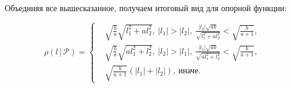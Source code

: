 \documentclass[11pt]{article}
\newcommand\PS{\mathcal{P}}
\newcommand\Sup[2]{\rho( #1 \, | \, #2 )}
\begin{document}
Объединяя все вышесказанное, получаем итоговый вид для опорной функции:

\begin{equation}
\Sup{l}{\PS} = 
\left\{
	\begin{aligned}
	& \sqrt{\frac{b}{a}}\sqrt{l_1^2+al_2^2}, \ |l_1| > |l_2|, \  \frac{|l_2|\sqrt{ab}}{\sqrt{l_1^2+al_2^2}} < \sqrt{\frac{b}{a+1}},\\
	& \sqrt{\frac{b}{a}}\sqrt{al_1^2+l_2^2}, \ |l_2| > |l_1|, \  \frac{|l_1|\sqrt{ab}}{\sqrt{al_1^2+l_2^2}} < \sqrt{\frac{b}{a+1}},\\
	& \sqrt{\frac{b}{a+1}}(|l_1| + |l_2|), \ \text{иначе}.
	\end{aligned}	
\right.
\end{equation}
\end{document}
